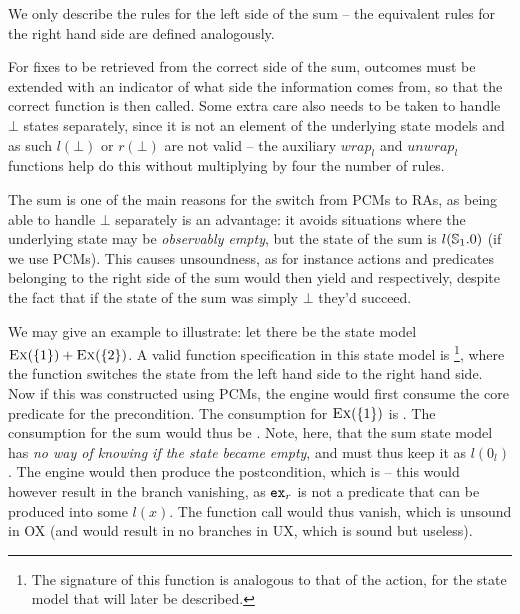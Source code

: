 We only describe the rules for the left side of the sum -- the equivalent rules for the right hand side are defined analogously.

For fixes to be retrieved from the correct side of the sum, \Miss{} outcomes must be extended with an indicator of what side the information comes from, so that the correct \fix{} function is then called. Some extra care also needs to be taken to handle $\bot$ states separately, since it is not an element of the underlying state models and as such $l(\bot)$ or $r(\bot)$ are not valid -- the auxiliary $\mathit{wrap}_l$ and $\mathit{unwrap}_l$ functions help do this without multiplying by four the number of rules.

The sum is one of the main reasons for the switch from PCMs to RAs, as being able to handle $\bot$ separately is an advantage: it avoids situations where the underlying state may be \emph{observably empty}, but the state of the sum is $l(\mathbb S_1.0)$ (if we use PCMs). This causes unsoundness, as for instance actions and predicates belonging to the right side of the sum would then yield \Err{} and \LFail{} respectively, despite the fact that if the state of the sum was simply $\bot$ they'd succeed.

We may give an example to illustrate: let there be the state model $\textsc{Ex}(\{1\}) + \textsc{Ex}(\{2\})$. A valid function specification in this state model is \footnote{The signature of this  function is analogous to that of the  action, for the \Freeable{} state model that will later be described.}, where the  function switches the state from the left hand side to the right hand side. Now if this was constructed using PCMs, the engine would first consume the core predicate for the precondition. The consumption for $\textsc{Ex}(\{1\})$ is . The consumption for the sum would thus be . Note, here, that the sum state model has \emph{no way of knowing if the state became empty}, and must thus keep it as $l(0_l)$. The engine would then produce the postcondition, which is  -- this would however result in the branch vanishing, as $\texttt{ex}_r$ is not a predicate that can be produced into some $l(x)$. The function call would thus vanish, which is unsound in OX (and would result in no branches in UX, which is sound but useless). 

